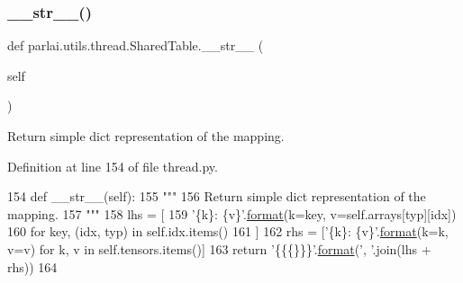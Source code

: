 \mbox{\label{classparlai_1_1utils_1_1thread_1_1SharedTable_aa18f723bbdfce0ab50d9c36b20cec2c7}} 
\subsubsection{\texorpdfstring{\+\_\+\+\_\+str\+\_\+\+\_\+()}{\_\_str\_\_()}}
{\footnotesize\ttfamily def parlai.\+utils.\+thread.\+Shared\+Table.\+\_\+\+\_\+str\+\_\+\+\_\+ (\begin{DoxyParamCaption}\item[{}]{self }\end{DoxyParamCaption})}

\begin{DoxyVerb}Return simple dict representation of the mapping.
\end{DoxyVerb}
 

Definition at line 154 of file thread.\+py.


\begin{DoxyCode}
154     \textcolor{keyword}{def }\_\_str\_\_(self):
155         \textcolor{stringliteral}{"""}
156 \textcolor{stringliteral}{        Return simple dict representation of the mapping.}
157 \textcolor{stringliteral}{        """}
158         lhs = [
159             \textcolor{stringliteral}{'\{k\}: \{v\}'}.\hyperlink{namespaceparlai_1_1chat__service_1_1services_1_1messenger_1_1shared__utils_a32e2e2022b824fbaf80c747160b52a76}{format}(k=key, v=self.arrays[typ][idx])
160             \textcolor{keywordflow}{for} key, (idx, typ) \textcolor{keywordflow}{in} self.idx.items()
161         ]
162         rhs = [\textcolor{stringliteral}{'\{k\}: \{v\}'}.\hyperlink{namespaceparlai_1_1chat__service_1_1services_1_1messenger_1_1shared__utils_a32e2e2022b824fbaf80c747160b52a76}{format}(k=k, v=v) \textcolor{keywordflow}{for} k, v \textcolor{keywordflow}{in} self.tensors.items()]
163         \textcolor{keywordflow}{return} \textcolor{stringliteral}{'\{\{\{\}\}\}'}.\hyperlink{namespaceparlai_1_1chat__service_1_1services_1_1messenger_1_1shared__utils_a32e2e2022b824fbaf80c747160b52a76}{format}(\textcolor{stringliteral}{', '}.join(lhs + rhs))
164 
\end{DoxyCode}
\mbox{\label{classparlai_1_1utils_1_1thread_1_1SharedTable_ab9acef58b28d0c992c841a4cc11a5df2}} 

